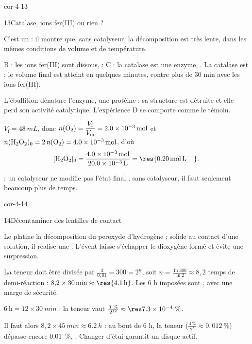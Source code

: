 \begin{blocLivre}{cor-4-13}
\begin{corrige}{13}{Catalase, ions fer(III) ou rien ?}
\begin{questions}
\item C'est un  : il montre que, sans catalyseur, la décomposition est très lente, dans les mêmes
conditions de volume et de température.
\item B : les ions fer(III) sont dissous,  ; C : la catalase est une enzyme,
. La catalase est  : le volume final est atteint en
quelques minutes, contre plus de 30 min avec les ions fer(III).
\item L'ébullition dénature l'enzyme, une protéine : sa structure est détruite et elle perd son activité catalytique.
L'expérience D se comporte comme le témoin.
\item $V_\mathrm{f}=\qty{48}{mL}$, donc $n(\ce{O2})=\dfrac{V_\mathrm{f}}{V_\mathrm{m}}=\qty{2,0e-3}{mol}$ et
$n(\ce{H2O2})_0=2\,n(\ce{O2})=\qty{4,0e-3}{mol}$, d'où
\[[\ce{H2O2}]_0=\frac{\qty{4,0e-3}{mol}}{\qty{20,0e-3}{L}}=\res{\qty{0,20}{mol.L^{-1}}}.\]
\item {} : un catalyseur ne modifie pas l'état final ; sans catalyseur, il faut seulement beaucoup plus de temps.
\end{questions}
\end{corrige}
\end{blocLivre}
\begin{blocLivre}{cor-4-14}
\begin{corrige}{14}{Décontaminer des lentilles de contact}
\begin{questions}
\item Le platine  la décomposition du peroxyde d'hydrogène ; solide au contact d'une solution, il
réalise une . L'évent laisse s'échapper le dioxygène formé et évite une surpression.
\item La teneur doit être divisée par $\frac{3}{0{,}01}=300=2^n$, soit $n=\frac{\ln300}{\ln2}\approx8{,}2$ temps de
demi-réaction : $8{,}2\times\qty{30}{min}\approx\res{\qty{4,1}{h}}$. Les 6 h imposées sont ,
avec une marge de sécurité.
\item $6~\text{h}=12\times\qty{30}{min}$ : la teneur vaut $\frac{3~\%}{2^{12}}\approx\res{\num{7.3e-4}~\%}$.
\item Il faut alors $8{,}2\times\qty{45}{min}\approx\qty{6,2}{h}$ : au bout de 6 h, la teneur ($\frac{3~\%}{2^{8}}\approx0{,}012~\%$)
dépasse encore 0,01~\%, . Changer d'étui garantit un disque actif.
\end{questions}
\end{corrige}
\end{blocLivre}
